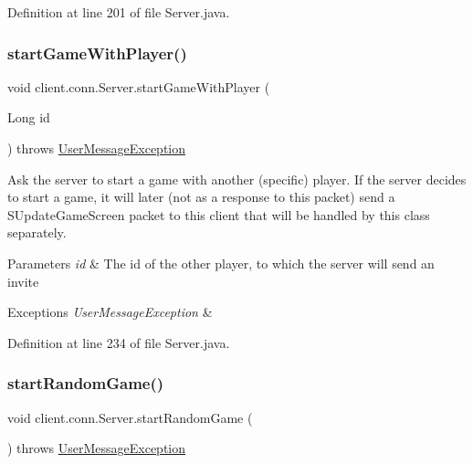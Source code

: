 Definition at line 201 of file Server.\+java.

\hypertarget{classclient_1_1conn_1_1_server_a6336de53822bd12d42e8445a598f2838}{}\label{classclient_1_1conn_1_1_server_a6336de53822bd12d42e8445a598f2838} 
\subsubsection{\texorpdfstring{start\+Game\+With\+Player()}{startGameWithPlayer()}}
{\footnotesize\ttfamily void client.\+conn.\+Server.\+start\+Game\+With\+Player (\begin{DoxyParamCaption}\item[{Long}]{id }\end{DoxyParamCaption}) throws \hyperlink{classsharedlib_1_1exceptions_1_1_user_message_exception}{User\+Message\+Exception}}

Ask the server to start a game with another (specific) player. If the server decides to start a game, it will later (not as a response to this packet) send a S\+Update\+Game\+Screen packet to this client that will be handled by this class separately. 
\begin{DoxyParams}{Parameters}
{\em id} & The id of the other player, to which the server will send an invite \\
\hline
\end{DoxyParams}

\begin{DoxyExceptions}{Exceptions}
{\em User\+Message\+Exception} & \\
\hline
\end{DoxyExceptions}


Definition at line 234 of file Server.\+java.

\hypertarget{classclient_1_1conn_1_1_server_afbeea330d5f40a6edd87387fa71bcc2d}{}\label{classclient_1_1conn_1_1_server_afbeea330d5f40a6edd87387fa71bcc2d} 
\subsubsection{\texorpdfstring{start\+Random\+Game()}{startRandomGame()}}
{\footnotesize\ttfamily void client.\+conn.\+Server.\+start\+Random\+Game (\begin{DoxyParamCaption}{ }\end{DoxyParamCaption}) throws \hyperlink{classsharedlib_1_1exceptions_1_1_user_message_exception}{User\+Message\+Exception}}

